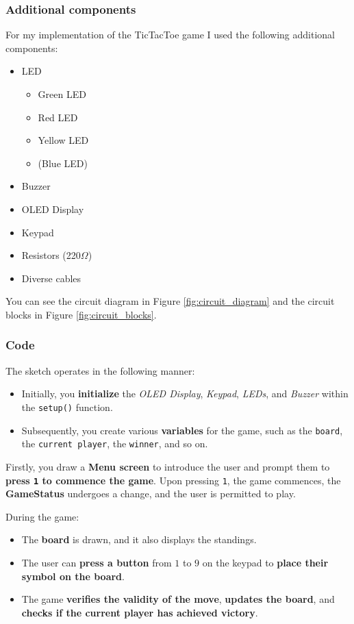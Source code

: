 \documentclass[10pt, oneside]{article}
\theoremstyle{remark}
\begin{document}
\subsubsection{Additional components}
For my implementation of the TicTacToe game I used the following additional components:
\begin{itemize}
  \item LED
  \begin{itemize}
    \item Green LED
    \item Red LED
    \item Yellow LED
    \item (Blue LED)
  \end{itemize}
  \item Buzzer
  \item OLED Display
  \item Keypad
  \item Resistors (220$\Omega$)
  \item Diverse cables
\end{itemize}
You can see the circuit diagram in Figure \ref{fig:circuit_diagram} and the circuit blocks in Figure \ref{fig:circuit_blocks}.

\subsubsection{Code}
The sketch operates in the following manner: 

\begin{itemize}
    \item Initially, you \textbf{initialize} the \textit{OLED Display}, \textit{Keypad}, \textit{LEDs}, and \textit{Buzzer} within the \texttt{setup()} function. 
    \item Subsequently, you create various \textbf{variables} for the game, such as the \texttt{board}, the \texttt{current player}, the \texttt{winner}, and so on.
\end{itemize}

\noindent Firstly, you draw a \textbf{Menu screen} to introduce the user and prompt them to \textbf{press \texttt{1} to commence the game}. Upon pressing \texttt{1}, the game commences, the \textbf{GameStatus} undergoes a change, and the user is permitted to play.

\noindent During the game:
\begin{itemize}
    \item The \textbf{board} is drawn, and it also displays the standings.
    \item The user can \textbf{press a button} from $1$ to $9$ on the keypad to \textbf{place their symbol on the board}.
    \item The game \textbf{verifies the validity of the move}, \textbf{updates the board}, and \textbf{checks if the current player has achieved victory}.
\end{itemize}
\end{document}
